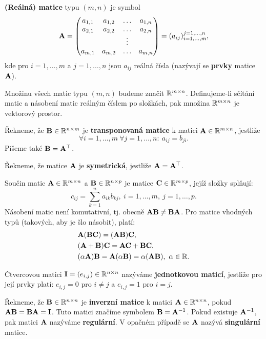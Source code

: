 \begin{df}
{\bf (Reálná) matice} typu $(m,n)$ je symbol
$$ \mathbf{A}=\begin{pmatrix}a_{1,1} & a_{1,2} & \ldots & a_{1,n}\\a_{2,1} & a_{2,2} & \ldots & a_{2,n}\\&&\vdots&\\a_{m,1} & a_{m,2} & \ldots & a_{m,n}\end{pmatrix} = (a_{ij})_{i=1,\ldots,m}^{j=1,\ldots,n}, $$
kde pro $i=1,\ldots,m$ a $j=1,\ldots,n$ jsou $a_{ij}$ reálná čísla (nazývají se {\bf prvky} matice $\mathbf{A}$).
% 
% 
\end{df}
Množinu všech matic typu $(m,n)$ budeme značit $\mathbb R^{m\times n}$.
Definujeme-li sčítání matic a násobení matic reálným číslem po složkách, pak množina $\mathbb R^{m\times n}$ je vektorový prostor.

\begin{df}
Řekneme, že $\mathbf{B}\in\mathbb R^{n\times m}$ je {\bf transponovaná matice} k matici $\mathbf{A}\in\mathbb R^{m\times n}$, jestliže
$$ \forall i=1,\ldots,m~\forall j=1,\ldots,n:~a_{ij}=b_{ji}. $$
Píšeme také $\mathbf{B}=\mathbf{A}^\top$.
\end{df}
\begin{df}
Řekneme, že matice $\mathbf{A}$ je {\bf symetrická}, jestliže $\mathbf{A}=\mathbf{A}^\top$.
\end{df}
% 
Součin matic $\mathbf{A}\in\mathbb R^{m\times n}$ a $\mathbf{B}\in\mathbb R^{n\times p}$ je matice $\mathbf{C}\in\mathbb R^{m\times p}$, jejíž složky splňují:
$$ c_{ij} = \sum_{k=1}^n a_{ik}b_{kj},~i=1,\ldots,m,~j=1,\ldots,p. $$
Násobení matic není komutativní, tj. obecně $\mathbf{A}\mathbf{B}\neq\mathbf{B}\mathbf{A}$.
Pro matice vhodných typů (takových, aby je šlo násobit), platí:
$$ \begin{aligned}
&\mathbf{A}(\mathbf{B}\mathbf{C})=(\mathbf{A}\mathbf{B})\mathbf{C},\\
&(\mathbf{A}+\mathbf{B})\mathbf{C}=\mathbf{A}\mathbf{C}+\mathbf{B}\mathbf{C},\\
&(\alpha\mathbf{A})\mathbf{B}=\mathbf{A}(\alpha\mathbf{B})=\alpha(\mathbf{A}\mathbf{B}),~\alpha\in\mathbb R.
\end{aligned} $$
\begin{df}
Čtvercovou matici $\mathbf{I}=(e_{i,j})\in\mathbb R^{n\times n}$ nazýváme {\bf jednotkovou maticí}, jestliže pro její prvky platí: $e_{i,j}=0$ pro $i\neq j$ a $e_{i,j}=1$ pro $i=j$.
\end{df}
\begin{df}
Řekneme, že $\mathbf{B}\in\mathbb R^{n\times n}$ je {\bf inverzní matice} k matici $\mathbf{A}\in\mathbb R^{n\times n}$, pokud $\mathbf{A}\mathbf{B}=\mathbf{B}\mathbf{A}=\mathbf{I}$.
Tuto matici značíme symbolem $\mathbf{B}=\mathbf{A}^{-1}$.
Pokud existuje $\mathbf{A}^{-1}$, pak matici $\mathbf{A}$ nazýváme {\bf regulární}. V opačném případě se $\mathbf{A}$ nazývá {\bf singulární} matice.
\end{df}

